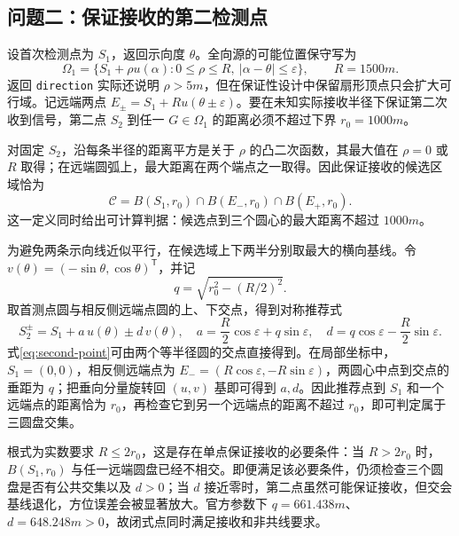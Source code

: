 \subsection{问题二：保证接收的第二检测点}

设首次检测点为 $S_1$，返回示向度 $\theta$。全向源的可能位置保守写为
\begin{equation}
\Omega_1=\{S_1+\rho u(\alpha):0\le\rho\le R,
\ |\alpha-\theta|\le\varepsilon\},\qquad R=1500\unit{m}.
\label{eq:first-sector}
\end{equation}
返回 \texttt{direction} 实际还说明 $\rho>5\unit{m}$，但在保证性设计中保留扇形顶点只会扩大可行域。记远端两点
$E_\pm=S_1+R u(\theta\pm\varepsilon)$。要在未知实际接收半径下保证第二次收到信号，第二点 $S_2$ 到任一 $G\in\Omega_1$ 的距离必须不超过下界 $r_0=1000\unit{m}$。

对固定 $S_2$，沿每条半径的距离平方是关于 $\rho$ 的凸二次函数，其最大值在 $\rho=0$ 或 $R$ 取得；在远端圆弧上，最大距离在两个端点之一取得。因此保证接收的候选区域恰为
\begin{equation}
\mathcal C=B(S_1,r_0)\cap B(E_-,r_0)\cap B(E_+,r_0).
\label{eq:candidate}
\end{equation}
这一定义同时给出可计算判据：候选点到三个圆心的最大距离不超过
$1000\unit{m}$。

为避免两条示向线近似平行，在候选域上下两半分别取最大的横向基线。令
$v(\theta)=(-\sin\theta,\cos\theta)^\mathsf{T}$，并记
\begin{equation}
q=\sqrt{r_0^2-(R/2)^2}.
\end{equation}
取首测点圆与相反侧远端点圆的上、下交点，得到对称推荐式
\begin{equation}
S_2^\pm=S_1+a\,u(\theta)\pm d\,v(\theta),
\quad
a=\frac R2\cos\varepsilon+q\sin\varepsilon,
\quad
d=q\cos\varepsilon-\frac R2\sin\varepsilon.
\label{eq:second-point}
\end{equation}
式\eqref{eq:second-point}可由两个等半径圆的交点直接得到。在局部坐标中，
$S_1=(0,0)$，相反侧远端点为
$E_-=(R\cos\varepsilon,-R\sin\varepsilon)$，两圆心中点到交点的垂距为 $q$；把垂向分量旋转回 $(u,v)$ 基即可得到 $a,d$。因此推荐点到 $S_1$ 和一个远端点的距离恰为 $r_0$，再检查它到另一个远端点的距离不超过 $r_0$，即可判定属于三圆盘交集。

根式为实数要求 $R\le2r_0$，这是存在单点保证接收的必要条件：当
$R>2r_0$ 时，$B(S_1,r_0)$ 与任一远端圆盘已经不相交。即便满足该必要条件，仍须检查三个圆盘是否有公共交集以及 $d>0$；当 $d$ 接近零时，第二点虽然可能保证接收，但交会基线退化，方位误差会被显著放大。官方参数下 $q=661.438\unit{m}$、$d=648.248\unit{m}>0$，故闭式点同时满足接收和非共线要求。

